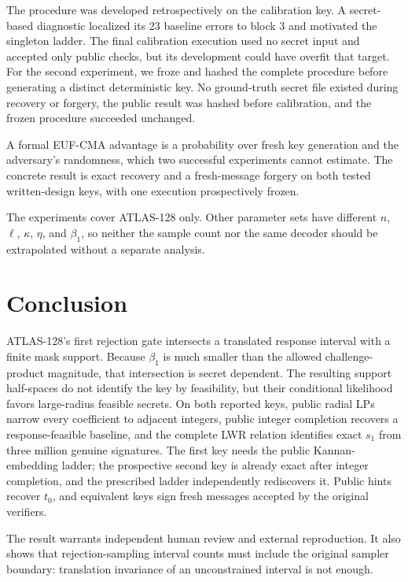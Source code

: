 \documentclass[11pt,a4paper]{article}
\begin{document}
The procedure was developed retrospectively on the calibration key.  A
secret-based diagnostic localized its 23 baseline errors to block 3 and
motivated the singleton ladder.  The final calibration execution used no
secret input and accepted only public checks, but its development could have
overfit that target.  For the second experiment, we froze and hashed the
complete procedure before generating a distinct deterministic key.  No
ground-truth secret file existed during recovery or forgery, the public result
was hashed before calibration, and the frozen procedure succeeded unchanged.

A formal EUF-CMA advantage is a probability over fresh key generation and the
adversary's randomness, which two successful experiments cannot estimate.
The concrete result is exact recovery and a fresh-message forgery on both
tested written-design keys, with one execution prospectively frozen.

The experiments cover ATLAS-128 only.  Other parameter sets have different
$n$, $\ell$, $\kappa$, $\eta$, and $\beta_1$, so neither the sample count nor
the same decoder should be extrapolated without a separate analysis.

\section{Conclusion}

ATLAS-128's first rejection gate intersects a translated response interval
with a finite mask support.  Because $\beta_1$ is much smaller than the
allowed challenge-product magnitude, that intersection is secret dependent.
The resulting support half-spaces do not identify the key by feasibility, but
their conditional likelihood favors large-radius feasible secrets.  On both
reported keys, public radial LPs narrow every coefficient to adjacent
integers, public integer completion recovers a response-feasible baseline,
and the complete LWR relation identifies exact $s_1$ from three million
genuine signatures.  The first key needs the public Kannan-embedding ladder;
the prospective second key is already exact after integer completion, and the
prescribed ladder independently rediscovers it.  Public hints recover $t_0$,
and equivalent keys sign fresh messages accepted by the original verifiers.

The result warrants independent human review and external reproduction.  It
also shows that rejection-sampling interval counts must include the original
sampler boundary: translation invariance of an unconstrained interval is not
enough.
\end{document}
